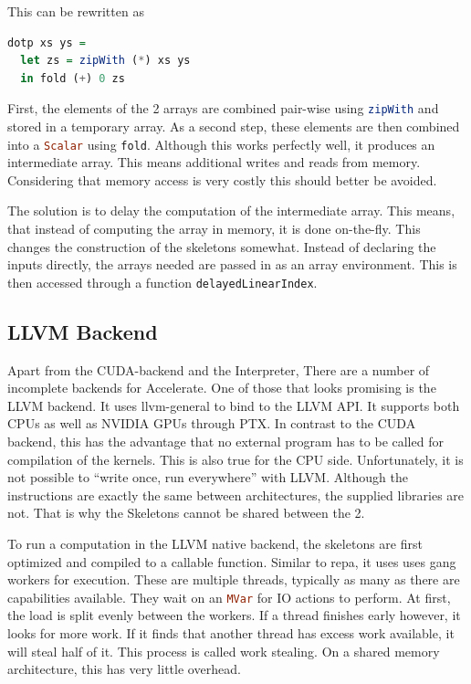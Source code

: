 \documentclass[a4paper,bibliography=totocnumbered,parskip,headsepline]{scrbook}
\begin{document}
This can be rewritten as

\begin{lstlisting}[language=haskell]
dotp xs ys =
  let zs = zipWith (*) xs ys
  in fold (+) 0 zs
\end{lstlisting}

First, the elements of the 2 arrays are combined pair-wise using \lstinline[language=haskell]!zipWith! and stored in a temporary array.
As a second step, these elements are then combined into a \lstinline[language=haskell]!Scalar! using \lstinline[language=haskell]!fold!.
Although this works perfectly well, it produces an intermediate array.
This means additional writes and reads from memory.
Considering that memory access is very costly this should better be avoided.

The solution is to delay the computation of the intermediate array.
This means, that instead of computing the array in memory, it is done on-the-fly.
This changes the construction of the skeletons somewhat.
Instead of declaring the inputs directly, the arrays needed are passed in as an array environment.
This is then accessed through a function \lstinline[language=haskell]!delayedLinearIndex!.

\subsection{LLVM Backend}
Apart from the CUDA-backend and the Interpreter, There are a number of incomplete backends for Accelerate.
One of those that looks promising is the LLVM backend.\cite{trevor2014llvm}
It uses llvm-general to bind to the LLVM API.
It supports both CPUs as well as NVIDIA GPUs through PTX.
In contrast to the CUDA backend, this has the advantage that no external program has to be called for compilation of the kernels.
This is also true for the CPU side.
Unfortunately, it is not possible to ``write once, run everywhere'' with LLVM.
Although the instructions are exactly the same between architectures, the supplied libraries are not.
That is why the Skeletons cannot be shared between the 2.

To run a computation in the LLVM native backend, the skeletons are first optimized and compiled to a callable function.
Similar to repa, it uses uses gang workers\cite{chakravarty2007data} for execution.
These are multiple threads, typically as many as there are capabilities available.
They wait on an \lstinline[language=haskell]!MVar! for IO actions to perform.
At first, the load is split evenly between the workers.
If a thread finishes early however, it looks for more work.
If it finds that another thread has excess work available, it will steal half of it.
This process is called work stealing.
On a shared memory architecture, this has very little overhead.
\end{document}
